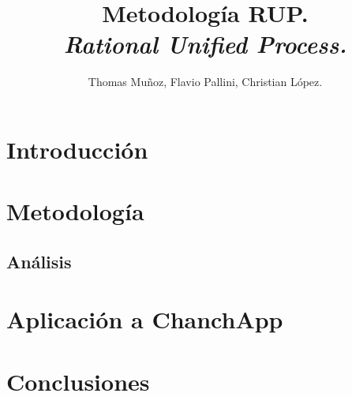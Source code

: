 \documentclass{udpreport}
\title{Metodología RUP.\\\textit{Rational Unified Process.}}
\author{Thomas Muñoz, Flavio Pallini, Christian López.}
\begin{document}
\maketitle
\tableofcontents
\chapter{Introducción}
\chapter{Metodología}
\section{Análisis} %
\chapter{Aplicación a ChanchApp}
\chapter{Conclusiones}
\end{document}

